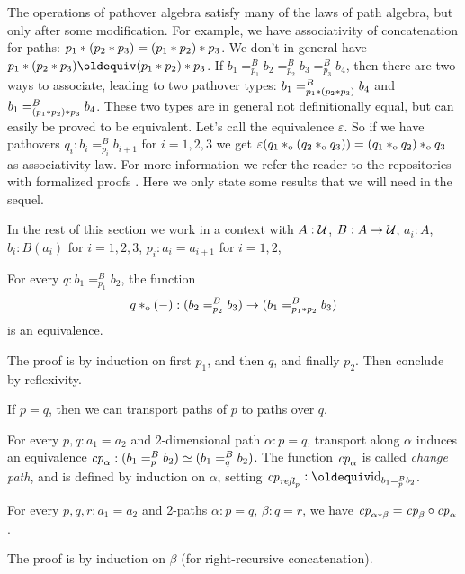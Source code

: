 \documentclass[a4,12pt]{amsart}
\begin{document}
The operations of pathover algebra satisfy many of the laws of path algebra,
but only after some modification. For example, we have
associativity of concatenation for paths: $p_1*(p_2* p_3) = (p_1* p_2)* p_3$.
We don't in general have $p_1\ct(p_2\ct p_3) \jdeq (p_1\ct p_2)\ct p_3$.
If $b_1 =^B_{p_1} b_2 =^B_{p_2} b_3 =^B_{p_3} b_4$, then there are
two ways to associate, leading to two pathover types:
$b_1 =^B_{p_1* (p_2* p_3)} b_4$ and $b_1 =^B_{(p_1* p_2) * p_3} b_4$.
These two types are in general not definitionally equal,
but can easily be proved to be equivalent. Let's call the
equivalence $\varepsilon$. So if we have pathovers $q_i : b_i =^B_{p_i} b_{i+1}$
for $i=1,2,3$ we get $\varepsilon(q_1 *_{\mathrm{o}} (q_2 *_{\mathrm{o}} q_3)) = (q_1 *_{\mathrm{o}} q_2)*_{\mathrm{o}} q_3$
as associativity law. For more information we refer the reader to the
repositories with formalized proofs \cite{XXX}. 
Here we only state some results that we will need in the sequel.

In the rest of this section we work in a context with
$A : \mathcal{U}$, $B : A \to \mathcal{U}$, $a_i:A$, $b_i:B(a_i)$ for $i=1,2,3$, 
$p_i : a_i = a_{i+1}$ for $i=1,2$,

\begin{lemma}\label{lem:concat-over}
  For every $q : b_1 =^B_{p_1} b_2$, the
  function
  \[
    q *_{\mathrm{o}} ({-}) : (b_2 =^B_{p_2} b_3) \to (b_1 =^B_{p_1* p_2} b_3)
  \]
  is an equivalence.
\end{lemma}
The proof is by induction on first $p_1$, and then $q$, and finally $p_2$.
Then conclude by reflexivity.

If $p=q$, then we can transport paths of $p$ to paths over $q$.

\begin{definition}\label{def:pathover-change-path}
  For every $p,q:a_1=a_2$ and $2$-dimensional path $\alpha : p = q$,
  transport along $\alpha$
  induces an equivalence $\mathit{cp}_{\alpha}: (b_1 =^B_p b_2) \simeq (b_1 =^B_q b_2)$.
  The function $\mathit{cp}_{\alpha}$ is called \emph{change path}, and is defined
  by induction on $\alpha$, setting $\cp{\refl{p}}\defeq \id_{b_1 =^B_p b_2}$.
\end{definition}

\begin{lemma}\label{lem:functorial-change-path}
  For every $p,q,r:a_1=a_2$ and 2-paths $\alpha : p = q$, $\beta : q = r$,
  we have $\mathit{cp}_{\alpha*\beta}=\mathit{cp}_{\beta}\circ\mathit{cp}_{\alpha}$.
\end{lemma}

The proof is by induction on $\beta$ (for right-recursive concatenation).
\end{document}
